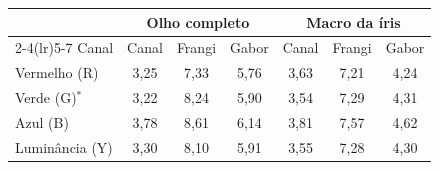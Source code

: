 \begin{tabular}{lcccccc}
\toprule
 & \multicolumn{3}{c}{Olho completo} & \multicolumn{3}{c}{Macro da íris} \\
\cmidrule(lr){2-4}\cmidrule(lr){5-7}
Canal & Canal & Frangi & Gabor & Canal & Frangi & Gabor \\
\midrule
Vermelho (R) & 3,25 & 7,33 & 5,76 & 3,63 & 7,21 & 4,24 \\
Verde (G)$^\ast$ & 3,22 & 8,24 & 5,90 & 3,54 & 7,29 & 4,31 \\
Azul (B) & 3,78 & 8,61 & 6,14 & 3,81 & 7,57 & 4,62 \\
Luminância (Y) & 3,30 & 8,10 & 5,91 & 3,55 & 7,28 & 4,30 \\
\bottomrule
\end{tabular}
